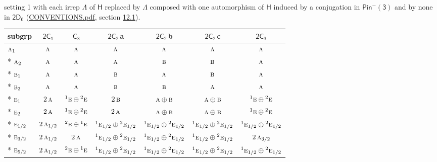 \documentclass[10pt,a4paper]{article}
\numberwithin{equation}{section}
\newcommand{\grp}[1]{\mathsf{#1}}
\newcommand{\irr}[1]{\text{\normalfont\scshape #1}}
\newcommand{\conjpair}[1]{{}^{#1}}
\newcommand{\clsletter}[1]{\,{\scriptsize\color{black!55}#1}}
\begin{document}
setting 1 with each irrep $\Lambda$ of $\grp{H}$ replaced by $\Lambda$ composed with one automorphism of $\grp{H}$ induced by a conjugation in \href{Pinminus3.pdf}{$\grp{Pin^{-}(3)}$} and by none in $\grp{2D_{6}}$ (\href{../../CONVENTIONS.pdf}{CONVENTIONS.pdf}, section \href{../../../rotation/CONVENTIONS.pdf\#conv.12.1}{12.1}).
{\small\begin{longtable}{@{}lcccccc@{}}\toprule
subgrp & \href{2C1.pdf}{$\grp{2C_{1}}$} & \href{C3.pdf}{$\grp{C_{3}}$} & \href{2C2.pdf}{$\grp{2C_{2}}$}\clsletter{a} & \href{2C2.pdf}{$\grp{2C_{2}}$}\clsletter{b} & \href{2C2.pdf}{$\grp{2C_{2}}$}\clsletter{c} & \href{2C3.pdf}{$\grp{2C_{3}}$}\\\midrule\endhead
\bottomrule\endfoot\endlastfoot
$\irr{a}_{1}$ & $\irr{a}$ & $\irr{a}$ & $\irr{a}$ & $\irr{a}$ & $\irr{a}$ & $\irr{a}$\\*
$\irr{a}_{2}$ & $\irr{a}$ & $\irr{a}$ & $\irr{a}$ & $\irr{b}$ & $\irr{b}$ & $\irr{a}$\\*
$\irr{b}_{1}$ & $\irr{a}$ & $\irr{a}$ & $\irr{b}$ & $\irr{a}$ & $\irr{b}$ & $\irr{a}$\\*
$\irr{b}_{2}$ & $\irr{a}$ & $\irr{a}$ & $\irr{b}$ & $\irr{b}$ & $\irr{a}$ & $\irr{a}$\\*
$\irr{e}_{1}$ & $2\,\irr{a}$ & $\conjpair{1}\irr{e}\oplus \conjpair{2}\irr{e}$ & $2\,\irr{b}$ & $\irr{a}\oplus \irr{b}$ & $\irr{a}\oplus \irr{b}$ & $\conjpair{1}\irr{e}\oplus \conjpair{2}\irr{e}$\\*
$\irr{e}_{2}$ & $2\,\irr{a}$ & $\conjpair{1}\irr{e}\oplus \conjpair{2}\irr{e}$ & $2\,\irr{a}$ & $\irr{a}\oplus \irr{b}$ & $\irr{a}\oplus \irr{b}$ & $\conjpair{1}\irr{e}\oplus \conjpair{2}\irr{e}$\\*
$\irr{e}_{1/2}$ & $2\,\irr{a}_{1/2}$ & $\conjpair{2}\irr{e}\oplus \conjpair{1}\irr{e}$ & $\conjpair{1}\irr{e}_{1/2}\oplus \conjpair{2}\irr{e}_{1/2}$ & $\conjpair{1}\irr{e}_{1/2}\oplus \conjpair{2}\irr{e}_{1/2}$ & $\conjpair{1}\irr{e}_{1/2}\oplus \conjpair{2}\irr{e}_{1/2}$ & $\conjpair{1}\irr{e}_{1/2}\oplus \conjpair{2}\irr{e}_{1/2}$\\*
$\irr{e}_{3/2}$ & $2\,\irr{a}_{1/2}$ & $2\,\irr{a}$ & $\conjpair{1}\irr{e}_{1/2}\oplus \conjpair{2}\irr{e}_{1/2}$ & $\conjpair{1}\irr{e}_{1/2}\oplus \conjpair{2}\irr{e}_{1/2}$ & $\conjpair{1}\irr{e}_{1/2}\oplus \conjpair{2}\irr{e}_{1/2}$ & $2\,\irr{a}_{3/2}$\\*
$\irr{e}_{5/2}$ & $2\,\irr{a}_{1/2}$ & $\conjpair{2}\irr{e}\oplus \conjpair{1}\irr{e}$ & $\conjpair{1}\irr{e}_{1/2}\oplus \conjpair{2}\irr{e}_{1/2}$ & $\conjpair{1}\irr{e}_{1/2}\oplus \conjpair{2}\irr{e}_{1/2}$ & $\conjpair{1}\irr{e}_{1/2}\oplus \conjpair{2}\irr{e}_{1/2}$ & $\conjpair{1}\irr{e}_{1/2}\oplus \conjpair{2}\irr{e}_{1/2}$\\
\bottomrule\end{longtable}}
\end{document}
